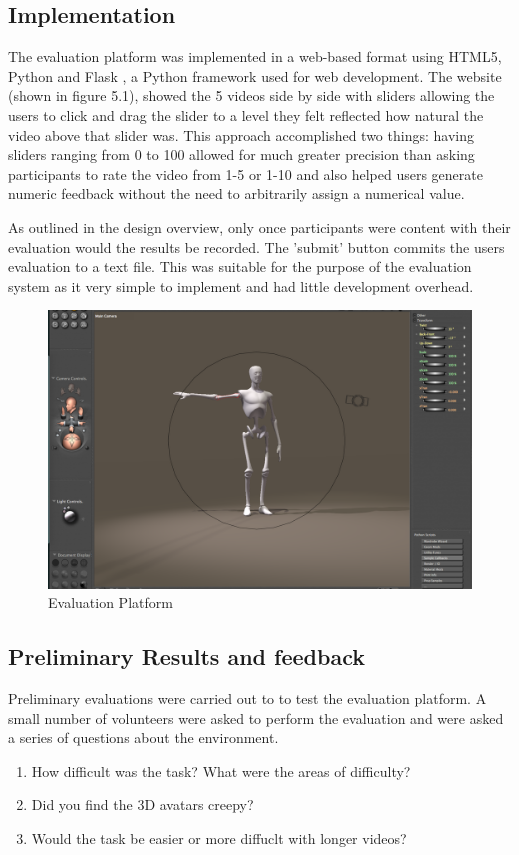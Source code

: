 \documentclass[bsc,frontabs,twoside,singlespacing,parskip]{infthesis}
\begin{document}
\subsection{Implementation}

The evaluation platform was implemented in a web-based format using HTML5, Python and Flask \cite{flask}, a Python framework used for web development. The website (shown in figure 5.1), showed the 5 videos side by side with sliders allowing the users to click and drag the slider to a level they felt reflected how natural the video above that slider was. This approach accomplished two things: having sliders ranging from 0 to 100 allowed for much greater precision than asking participants to rate the video from 1-5 or 1-10 and also helped users generate numeric feedback without the need to arbitrarily assign a numerical value.

As outlined in the design overview, only once participants were content with their evaluation would the results be recorded. The 'submit' button commits the users evaluation to a text file. This was suitable for the purpose of the evaluation system as it very simple to implement and had little development overhead.

\begin{figure}
	\centering
	\includegraphics[width=.7\textwidth]{poser.png}
	\caption{Evaluation Platform}
\end{figure}

\subsection{Preliminary Results and feedback}

Preliminary evaluations were carried out to to test the evaluation platform. A small number of volunteers were asked to perform the evaluation and were asked a series of questions about the environment.

\begin{enumerate}
\item{How difficult was the task? What were the areas of difficulty?}
\item{Did you find the 3D avatars creepy?}
\item{Would the task be easier or more diffuclt with longer videos?}
\end{enumerate}
\end{document}
